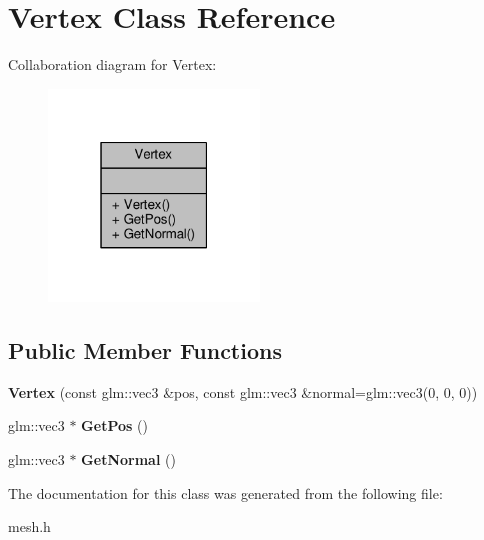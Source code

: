 \hypertarget{class_vertex}{}\section{Vertex Class Reference}
\label{class_vertex}


Collaboration diagram for Vertex\+:\nopagebreak
\begin{figure}[H]
\begin{center}
\leavevmode
\includegraphics[width=159pt]{class_vertex__coll__graph}
\end{center}
\end{figure}
\subsection*{Public Member Functions}
\begin{DoxyCompactItemize}
\item 
{\bfseries Vertex} (const glm\+::vec3 \&pos, const glm\+::vec3 \&normal=glm\+::vec3(0, 0, 0))\hypertarget{class_vertex_ad575d03337b04df7b54f992a3b5431b0}{}\label{class_vertex_ad575d03337b04df7b54f992a3b5431b0}

\item 
glm\+::vec3 $\ast$ {\bfseries Get\+Pos} ()\hypertarget{class_vertex_a2b1f942f9af5b03144bd92b9ca115aea}{}\label{class_vertex_a2b1f942f9af5b03144bd92b9ca115aea}

\item 
glm\+::vec3 $\ast$ {\bfseries Get\+Normal} ()\hypertarget{class_vertex_ab8137faa3c736fd97e400b4f75750900}{}\label{class_vertex_ab8137faa3c736fd97e400b4f75750900}

\end{DoxyCompactItemize}


The documentation for this class was generated from the following file\+:\begin{DoxyCompactItemize}
\item 
mesh.\+h\end{DoxyCompactItemize}
